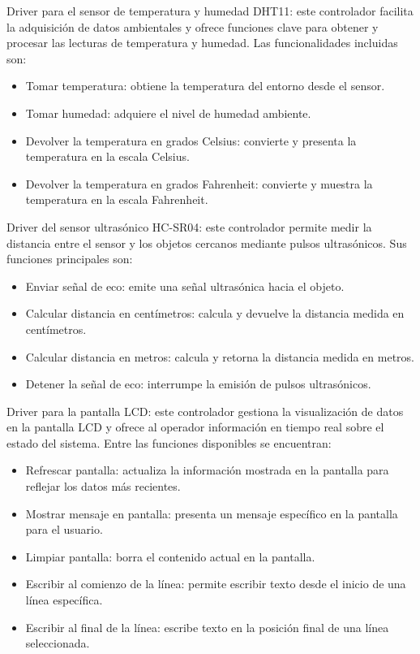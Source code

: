 Driver para el sensor de temperatura y humedad DHT11: este controlador facilita la adquisición de datos ambientales y ofrece funciones clave para obtener y procesar las lecturas de temperatura y humedad. Las funcionalidades incluidas son:
\begin{itemize}
\item Tomar temperatura: obtiene la temperatura del entorno desde el sensor.
\item Tomar humedad: adquiere el nivel de humedad ambiente.
\item Devolver la temperatura en grados Celsius: convierte y presenta la temperatura en la escala Celsius.
\item Devolver la temperatura en grados Fahrenheit: convierte y muestra la temperatura en la escala Fahrenheit.
\end{itemize}

Driver del sensor ultrasónico HC-SR04: este controlador permite medir la distancia entre el sensor y los objetos cercanos mediante pulsos ultrasónicos. Sus funciones principales son:
\begin{itemize}
\item Enviar señal de eco: emite una señal ultrasónica hacia el objeto.
\item Calcular distancia en centímetros: calcula y devuelve la distancia medida en centímetros.
\item Calcular distancia en metros: calcula y retorna la distancia medida en metros.
\item Detener la señal de eco: interrumpe la emisión de pulsos ultrasónicos.
\end{itemize}

Driver para la pantalla LCD: este controlador gestiona la visualización de datos en la pantalla LCD y ofrece al operador información en tiempo real sobre el estado del sistema. Entre las funciones disponibles se encuentran:
\begin{itemize}
\item Refrescar pantalla: actualiza la información mostrada en la pantalla para reflejar los datos más recientes.
\item Mostrar mensaje en pantalla: presenta un mensaje específico en la pantalla para el usuario.
\item Limpiar pantalla: borra el contenido actual en la pantalla.
\item Escribir al comienzo de la línea: permite escribir texto desde el inicio de una línea específica.
\item Escribir al final de la línea: escribe texto en la posición final de una línea seleccionada.
\end{itemize}


